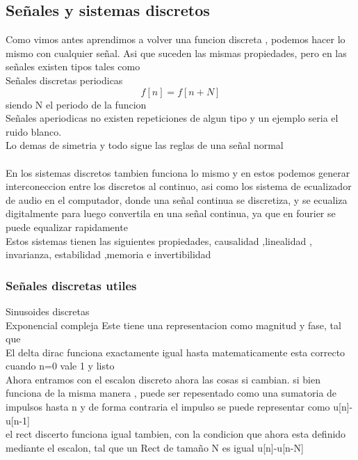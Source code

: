 \subsection{Señales y sistemas discretos}
Como vimos antes aprendimos a volver una funcion discreta , podemos hacer lo mismo con cualquier señal. Asi que suceden las mismas propiedades, pero en las señales existen tipos  tales como \\
Señales discretas periodicas $$f[n]= f[n+N]$$ siendo N el periodo de la funcion
\\ Señales aperiodicas no existen repeticiones de algun tipo y un ejemplo seria el ruido blanco. \\ Lo demas de simetria y todo sigue las reglas de una señal normal
\\\\ En los sistemas discretos tambien funciona lo mismo y en estos podemos generar interconeccion entre los discretos al continuo, asi como los sistema de ecualizador de audio en el computador, donde una señal continua se discretiza, y se ecualiza digitalmente para luego convertila en una señal continua, ya que en fourier se puede equalizar rapidamente\\
Estos sistemas tienen las siguientes propiedades, causalidad ,linealidad , invarianza, estabilidad ,memoria e invertibilidad
\subsubsection{Señales discretas utiles}
Sinusoides discretas \\
Exponencial compleja   Este tiene una representacion como magnitud y fase, tal que \\
El delta dirac funciona exactamente igual hasta matematicamente esta correcto  cuando n=0 vale 1 y listo \\ 
Ahora entramos con el escalon discreto ahora las cosas si cambian. si bien funciona de la misma manera , puede ser repesentado como una sumatoria de impulsos hasta n y de forma contraria el impulso se puede representar como  u[n]-u[n-1]\\
el rect discerto funciona igual tambien, con la condicion que ahora esta definido mediante el escalon, tal que un Rect de tamaño N es igual  u[n]-u[n-N]
